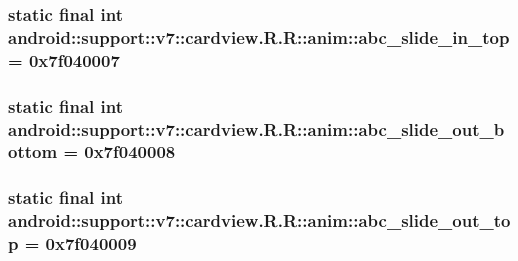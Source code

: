 \hypertarget{classandroid_1_1support_1_1v7_1_1cardview_1_1_r_1_1anim_9fb11d1cff3f71b588d3cf87264dfbd6}{
\subsubsection[{abc\_\-slide\_\-in\_\-top}]{\setlength{\rightskip}{0pt plus 5cm}static final int android::support::v7::cardview.R.R::anim::abc\_\-slide\_\-in\_\-top = 0x7f040007}}
\label{classandroid_1_1support_1_1v7_1_1cardview_1_1_r_1_1anim_9fb11d1cff3f71b588d3cf87264dfbd6}


\hypertarget{classandroid_1_1support_1_1v7_1_1cardview_1_1_r_1_1anim_22528848cc660cfe1339f37b90053b23}{
\subsubsection[{abc\_\-slide\_\-out\_\-bottom}]{\setlength{\rightskip}{0pt plus 5cm}static final int android::support::v7::cardview.R.R::anim::abc\_\-slide\_\-out\_\-bottom = 0x7f040008}}
\label{classandroid_1_1support_1_1v7_1_1cardview_1_1_r_1_1anim_22528848cc660cfe1339f37b90053b23}


\hypertarget{classandroid_1_1support_1_1v7_1_1cardview_1_1_r_1_1anim_cf846e5f999918a1d01794f7f6d57c56}{
\subsubsection[{abc\_\-slide\_\-out\_\-top}]{\setlength{\rightskip}{0pt plus 5cm}static final int android::support::v7::cardview.R.R::anim::abc\_\-slide\_\-out\_\-top = 0x7f040009}}
\label{classandroid_1_1support_1_1v7_1_1cardview_1_1_r_1_1anim_cf846e5f999918a1d01794f7f6d57c56}


